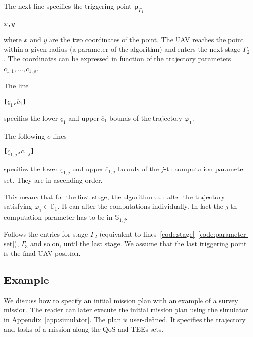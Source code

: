 \documentclass[letterpaper,10pt,conference]{ieeeconf}
\theoremstyle{definition}
\begin{document}
The next line specifies the triggering point $\mathbf{p}_{\Gamma_1}$
\begin{algorithmic}[1]
  \State\textbf{\texttt{$x$,$y$}}\label{code:trigger-pt}
\end{algorithmic}
where $x$ and $y$ are the two coordinates of the point. The UAV reaches the point within a given radius (a parameter of the algorithm) and enters the next stage $\Gamma_2$. The coordinates can be expressed in function of the trajectory parameters $c_{1,1},\dots,c_{1,\rho}$.

The line
\begin{algorithmic}[1]
  \State\textbf{\texttt{[$\underline{c}_1$,$\overline{c}_1$]}}\label{code:tee-set}
\end{algorithmic}
specifies the lower $\underline{c}_{1}$ and upper $\overline{c}_{1}$ bounds of the trajectory $\varphi_1$.

The following $\sigma$ lines
\begin{algorithmic}[1]
  \State\textbf{\texttt{[$\underline{c}_{1,j}$,$\overline{c}_{1,j}$]}}\label{code:parameter-set}
\end{algorithmic}
specifies the lower $\underline{c}_{1,j}$ and upper $\overline{c}_{1,j}$ bounds of the $j$-th computation parameter set. They are in ascending order. 

This means that for the first stage, the algorithm can alter the trajectory satisfying $\varphi_1\in\mathbb{C}_1$. It can alter the computations individually. In fact the $j$-th computation parameter has to be in $\mathbb{S}_{1,j}$.

Follows the entries for stage $\Gamma_2$ (equivalent to lines~\ref{code:stage}--\ref{code:parameter-set}), $\Gamma_3$ and so on, until the last stage. We assume that the last triggering point is the final UAV position.

\subsection{Example}
\label{app:plan-example}

We discuss how to specify an initial mission plan with an example of a survey mission. The reader can later execute the initial mission plan using the simulator in Appendix~\ref{app:simulator}. The plan is user-defined. It specifies the trajectory and tasks of a mission along the QoS and TEEs sets. 
\end{document}
